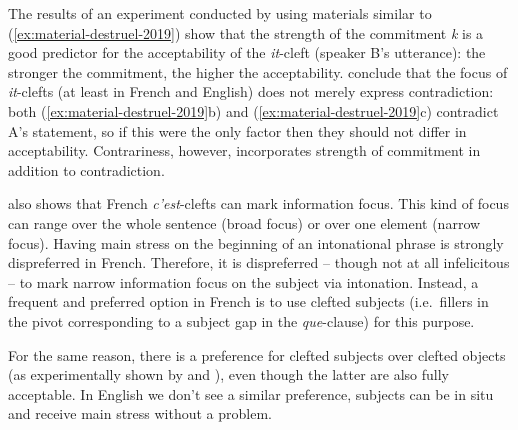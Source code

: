 The results of an experiment conducted by \citet{Destruel.2019} using materials similar to (\ref{ex:material-destruel-2019}) show that the strength of the commitment \emph{k} is a good predictor for the acceptability of the \emph{it}-cleft (speaker B's utterance): the stronger the commitment, the higher the acceptability. \citet{Destruel.2019} conclude that the focus of \emph{it}-clefts (at least in French and English) does not merely express contradiction: both (\ref{ex:material-destruel-2019}b) and (\ref{ex:material-destruel-2019}c) contradict A's statement, so if this were the only factor then they should not differ in acceptability. Contrariness, however, incorporates strength of commitment in addition to contradiction. 


\citet{Destruel.2012} also shows that French \emph{c'est}-clefts can mark information focus. This kind of focus can range over the whole sentence (broad focus) or over one element (narrow focus). Having main stress on the beginning of an intonational phrase is strongly dispreferred in French. Therefore, it is dispreferred -- though not at all infelicitous -- to mark narrow information focus on the subject via intonation. Instead, a frequent and preferred option in French is to use clefted subjects (i.e.\ fillers in the pivot corresponding to a subject gap in the \emph{que}-clause) for this purpose. %

For the same reason, there is a preference for clefted subjects over clefted objects (as experimentally shown by \citet{Destruel.2012} and \citet{Destruel.2019}), even though the latter are also fully acceptable. In English we don't see a similar preference, subjects can be in situ and receive main stress without a problem. 

